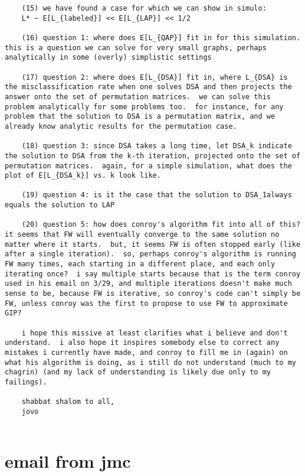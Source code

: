 \begin{verbatim}
	(15) we have found a case for which we can show in simulo:
	L* ~ E[L_{labeled}] << E[L_{LAP}] << 1/2

	(16) question 1: where does E[L_{QAP}] fit in for this simulation.  this is a question we can solve for very small graphs, perhaps analytically in some (overly) simplistic settings

	(17) question 2: where does E[L_{DSA}] fit in, where L_{DSA} is the misclassification rate when one solves DSA and then projects the answer onto the set of permutation matrices.  we can solve this problem analytically for some problems too.  for instance, for any problem that the solution to DSA is a permutation matrix, and we already know analytic results for the permutation case.

	(18) question 3: since DSA takes a long time, let DSA_k indicate the solution to DSA from the k-th iteration, projected onto the set of permutation matrices.  again, for a simple simulation, what does the plot of E[L_{DSA_k}] vs. k look like.

	(19) question 4: is it the case that the solution to DSA_1always equals the solution to LAP

	(20) question 5: how does conroy's algorithm fit into all of this? it seems that FW will eventually converge to the same solution no matter where it starts.  but, it seems FW is often stopped early (like after a single iteration).  so, perhaps conroy's algorithm is running FW many times, each starting in a different place, and each only iterating once?  i say multiple starts because that is the term conroy used in his email on 3/29, and multiple iterations doesn't make much sense to be, because FW is iterative, so conroy's code can't simply be FW, unless conroy was the first to propose to use FW to approximate GIP?

	i hope this missive at least clarifies what i believe and don't understand.  i also hope it inspires somebody else to correct any mistakes i currently have made, and conroy to fill me in (again) on what his algorithm is doing, as i still do not understand (much to my chagrin) (and my lack of understanding is likely due only to my failings).

	shabbat shalom to all,
	jovo
	
\end{verbatim}

\section{email from jmc}

